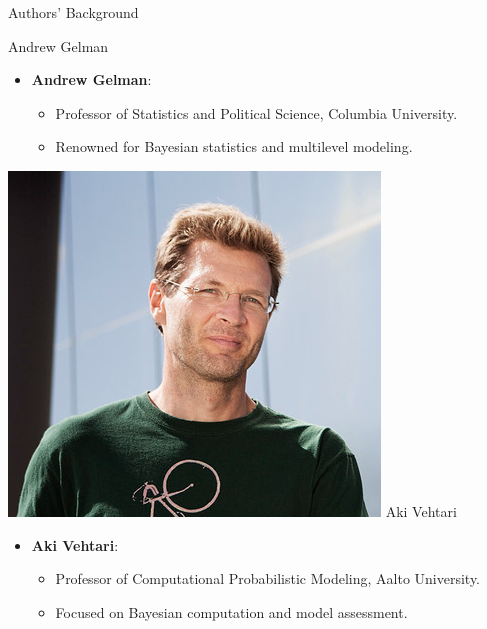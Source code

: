 \documentclass{beamer}
\begin{document}
\begin{frame}{Authors' Background}
\begin{minipage}{0.3\textwidth}
    \centering
    \small Andrew Gelman
\end{minipage}
\hfill
\begin{minipage}{0.65\textwidth}
    \begin{itemize}
        \item \textbf{Andrew Gelman}:
        \begin{itemize}
            \item Professor of Statistics and Political Science, Columbia University.
            \item Renowned for Bayesian statistics and multilevel modeling.
        \end{itemize}
    \end{itemize}
\end{minipage}

\vspace{1em}

\begin{minipage}{0.3\textwidth}
    \includegraphics[width=\textwidth]{aki_vehtari.png} %
    \centering
    \small Aki Vehtari
\end{minipage}
\hfill
\begin{minipage}{0.65\textwidth}
    \begin{itemize}
        \item \textbf{Aki Vehtari}:
        \begin{itemize}
            \item Professor of Computational Probabilistic Modeling, Aalto University.
            \item Focused on Bayesian computation and model assessment.
        \end{itemize}
    \end{itemize}
\end{minipage}
\end{frame}
\end{document}
